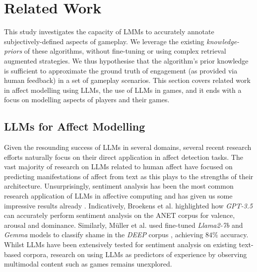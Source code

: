 \section{Related Work}
\label{sec:background}

This study investigates the capacity of LMMs to accurately annotate subjectively-defined aspects of gameplay. We leverage the existing \emph{knowledge-priors} of these algorithms, without fine-tuning or using complex retrieval augmented strategies. We thus hypothesise that the algorithm's prior knowledge is sufficient to approximate the ground truth of engagement (as provided via human feedback) in a set of gameplay scenarios. This section covers related work in affect modelling using LLMs, the use of LLMs in games, and it ends with a focus on modelling aspects of players and their games.

\subsection{LLMs for Affect Modelling}

Given the resounding success of LLMs in several domains, several recent research efforts naturally focus on their direct application in affect detection tasks. The vast majority of research on LLMs related to human affect have focused on predicting manifestations of affect from text as this plays to the strengths of their architecture. Unsurprisingly, sentiment analysis has been the most common research application of LLMs in affective computing and has given us some impressive results already \cite{mao2022biases}. Indicatively, Broekens et al. \cite{broekens2023fine} highlighted how \emph{GPT-3.5} can accurately perform sentiment analysis on the ANET corpus \cite{bradley2007affective} for valence, arousal and dominance. Similarly, Müller et al. \cite{muller2024recognizing} used fine-tuned \emph{Llama2-7b} \cite{touvron2023llama} and \emph{Gemma} \cite{team2024gemma} models to classify shame in the \emph{DEEP} corpus \cite{schneeberger2023deep}, achieving $84\%$ accuracy. Whilst LLMs have been extensively tested for sentiment analysis on existing text-based corpora, research on using LLMs as predictors of experience by observing multimodal content such as games remains unexplored. 

